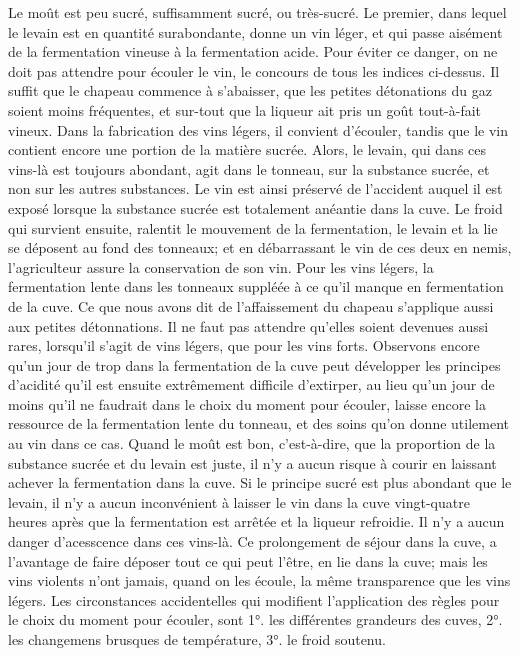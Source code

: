 Le moût est peu sucré, suffisamment sucré, ou très-sucré. Le premier, dans lequel le levain est en quantité surabondante, donne un vin léger, et qui passe aisément de la fermentation vineuse à la fermentation acide. Pour éviter ce danger, on ne doit pas attendre pour écouler le vin, le concours de tous les indices ci-dessus. Il suffit que le chapeau commence à s'abaisser, que les petites détonations du gaz soient moins fréquentes, et sur-tout que la liqueur ait pris un goût tout-à-fait vineux.
Dans la fabrication des vins légers, il convient d'écouler, tandis que le vin contient encore une portion de la matière sucrée. Alors, le levain, qui dans ces vins-là est toujours abondant, agit dans le tonneau, sur la substance sucrée, et non sur les autres substances. Le vin est ainsi préservé de l'accident auquel il est exposé lorsque la substance sucrée est totalement anéantie dans la cuve.
Le froid qui survient ensuite, ralentit le mouvement de la fermentation, le levain et la lie se déposent au fond des tonneaux; et en débarrassant le vin de ces deux en\setcounter{page}{148} nemis, l'agriculteur assure la conservation de son vin.
Pour les vins légers, la fermentation lente dans les tonneaux suppléée à ce qu'il manque en fermentation de la cuve.
Ce que nous avons dit de l'affaissement du chapeau s'applique aussi aux petites détonnations. Il ne faut pas attendre qu'elles soient devenues aussi rares, lorsqu'il s'agit de vins légers, que pour les vins forts.
Observons encore qu'un jour de trop dans la fermentation de la cuve peut développer les principes d'acidité qu'il est ensuite extrêmement difficile d'extirper, au lieu qu'un jour de moins qu'il ne faudrait dans le choix du moment pour écouler, laisse encore la ressource de la fermentation lente du tonneau, et des soins qu'on donne utilement au vin dans ce cas.
Quand le moût est bon, c'est-à-dire, que la proportion de la substance sucrée et du levain est juste, il n'y a aucun risque à courir en laissant achever la fermentation dans la cuve.
Si le principe sucré est plus abondant que le levain, il n'y a aucun inconvénient à laisser le vin dans la cuve vingt-quatre heures après que la fermentation est arrêtée et la liqueur refroidie. Il n'y a aucun danger\setcounter{page}{149} d'acesscence dans ces vins-là. Ce prolongement de séjour dans la cuve, a l'avantage de faire déposer tout ce qui peut l'être, en lie dans la cuve; mais les vins violents n'ont jamais, quand on les écoule, la même transparence que les vins légers.
Les circonstances accidentelles qui modifient l'application des règles pour le choix du moment pour écouler, sont 1°. les différentes grandeurs des cuves, 2°. les changemens brusques de température, 3°. le froid soutenu.
